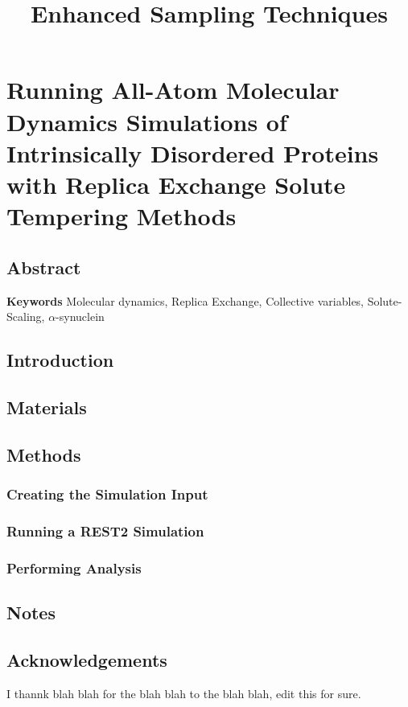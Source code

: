 \documentclass{memoir}
\title{Enhanced Sampling Techniques}
\begin{document}
\date{}

\maketitle

\tableofcontents

\chapter{Running All-Atom Molecular Dynamics Simulations of Intrinsically Disordered Proteins with Replica Exchange Solute Tempering Methods}

\section{Abstract}


\textbf{Keywords} Molecular dynamics, Replica Exchange, Collective variables, Solute-Scaling, $\alpha$-synuclein

\section{Introduction}\label{sec:Intro}

    





\section{Materials}



\section{Methods}

\subsection{Creating the Simulation Input}

\subsection{Running a REST2 Simulation}

\subsection{Performing Analysis}


\section{Notes}






\section{Acknowledgements}
I thannk blah blah for the blah blah to the blah blah, edit this for sure.


\end{document}
